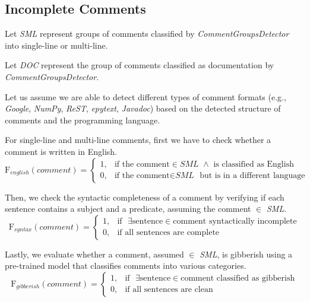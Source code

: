 \subsection{Incomplete Comments}
Let \textit{SML} represent groups of comments classified by \textit{CommentGroupsDetector} into single-line or multi-line.

\noindent Let \textit{DOC} represent the group of comments classified as documentation by \textit{CommentGroupsDetector}.

\noindent Let us assume we are able to detect different types of comment formats (e.g., \textit{Google}, \textit{NumPy}, \textit{ReST}, \textit{epytext}, \textit{Javadoc}) based on the detected structure of comments and the programming language.

\noindent For single-line and multi-line comments, first we have to check whether a comment is written in English.
\begin{equation*}
	\mathrm{F}_{english}(comment) = \begin{cases}
		1, & \text{if the comment} \in \textit{SML } \wedge \text{ is classified as English} \\
		0, & \text{if the comment} \in \textit{SML } \text{ but is in a different language}
	\end{cases}
\end{equation*}

\noindent Then, we check the syntactic completeness of a comment by verifying if each sentence contains a subject and a predicate, assuming the comment $\in$ \textit{SML}.
\begin{equation*}
	\mathrm{F}_{syntax}(comment) = \begin{cases}
		1, & \text{if  } \exists \text{sentence} \in \text{comment syntactically incomplete} \\
		0, & \text{if all sentences are complete}
	\end{cases}
\end{equation*}

\noindent Lastly, we evaluate whether a comment, assumed $\in$ \textit{SML}, is gibberish using a pre-trained model \cite{gibberishDetector} that classifies comments into various categories.
\begin{equation*}
	\mathrm{F}_{gibberish}(comment) = \begin{cases}
		1, & \text{if  } \exists \text{sentence} \in \text{comment classified as gibberish} \\
		0, & \text{if all sentences are clean}
	\end{cases}
\end{equation*}

